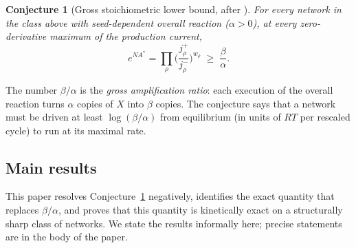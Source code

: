 \documentclass[11pt,reqno]{amsart}
\theoremstyle{plain}
\newtheorem{conjecture}[theorem]{Conjecture}
\theoremstyle{definition}
\theoremstyle{remark}
\numberwithin{equation}{section}
\begin{document}
\begin{conjecture}[Gross stoichiometric lower bound, after {\cite[Eq.~(33)]{DDL24}}]\label{conj:gross}
For every network in the class above with seed-dependent overall reaction ($\alpha>0$), at every zero-derivative maximum of the production current,
\[
e^{NA^*}=\prod_\rho\Big(\frac{j^+_\rho}{j^-_\rho}\Big)^{w_\rho}\;\ge\;\frac{\beta}{\alpha}.
\]
\end{conjecture}

The number $\beta/\alpha$ is the \emph{gross amplification ratio}: each execution of the overall reaction turns $\alpha$ copies of $X$ into $\beta$ copies.  The conjecture says that a network must be driven at least $\log(\beta/\alpha)$ from equilibrium (in units of $RT$ per rescaled cycle) to run at its maximal rate.

\subsection{Main results}
This paper resolves Conjecture~\ref{conj:gross} negatively, identifies the exact quantity that replaces $\beta/\alpha$, and proves that this quantity is kinetically exact on a structurally sharp class of networks.  We state the results informally here; precise statements are in the body of the paper.
\end{document}
